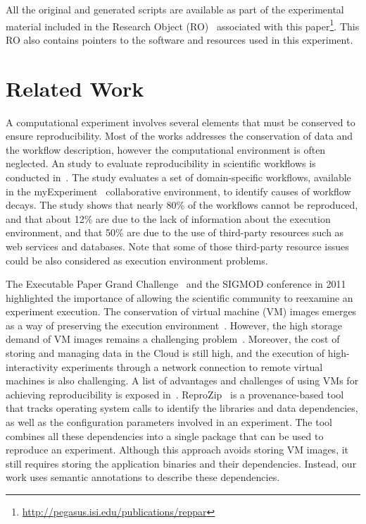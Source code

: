 \documentclass[final,5p,times,twocolumn]{elsarticle}
\begin{document}
All the original and generated scripts are available as part of the experimental material included in the Research Object (RO)~\cite{researchObjects} associated with this paper\footnote{\url{http://pegasus.isi.edu/publications/reppar}}. This RO also contains pointers to the software and resources used in this experiment.



\section{Related Work}
\label{sec:related-work}

A computational experiment involves several elements that must be conserved to ensure reproducibility. Most of the works addresses the conservation of data and the workflow description, however the computational environment is often neglected. 
An study to evaluate reproducibility in scientific workflows is conducted in~\cite{zhao2012}. The study evaluates a set of domain-specific workflows, available in the myExperiment~\cite{myExperiment} collaborative environment, to identify causes of workflow decays. The study shows that nearly 80\% of the workflows cannot be reproduced, and that about 12\% are due to the lack of information about the execution environment, and that 50\% are due to the use of third-party resources such as web services and databases. Note that some of those third-party resource issues could be also considered as execution environment problems. 

The Executable Paper Grand Challenge~\cite{elsevierchallenge} and the SIGMOD conference in 2011~\cite{SIGMOD} highlighted the importance of allowing the scientific community to reexamine an experiment execution. The conservation of virtual machine (VM) images emerges as a way of preserving the execution environment~\cite{Brammer,SHARE}. However, the high storage demand of VM images remains a challenging problem~\cite{Mao:2014:ROD:2600090.2512348,6552826}. Moreover, the cost of storing and managing data in the Cloud is still high, and the execution of high-interactivity experiments through a network connection to remote virtual machines is also challenging. A list of advantages and challenges of using VMs for achieving reproducibility is exposed in~\cite{Howe2012}. ReproZip~\cite{reprozip} is a provenance-based tool that tracks operating system calls to identify the libraries and data dependencies, as well as the configuration parameters involved in an experiment. The tool combines all these dependencies into a single package that can be used to reproduce an experiment. Although this approach avoids storing VM images, it still requires storing the application binaries and their dependencies. Instead, our work uses semantic annotations to describe these dependencies.
\end{document}
